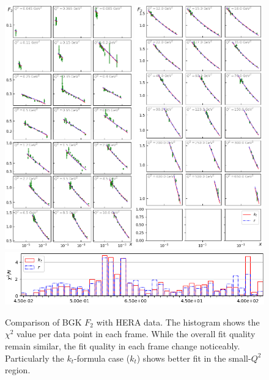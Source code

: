 \documentclass[12pt]{article}
\numberwithin{equation}{section}
\numberwithin{table}{section}
\numberwithin{figure}{section}
\begin{document}
\begin{figure}[p]
\includegraphics[width=0.49\textwidth]{./plots/Figure_2-1.png}
\includegraphics[width=0.49\textwidth]{./plots/Figure_2-2.png}
\includegraphics[width=\textwidth]{./plots/Figure_2-3.png}
\caption{Comparison of BGK $F_2$ with HERA data. The histogram shows the $\chi^2$ value per data point in each frame. While the overall fit quality remain similar, the fit quality in each frame change noticeably. Particularly the $k_t$-formula case ($k_t$) shows better fit in the small-$Q^2$ region.}
\label{fig:BGK-Grid}
\end{figure}
\end{document}

